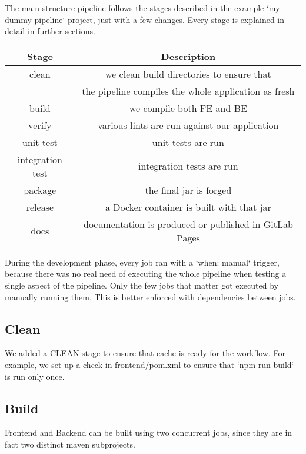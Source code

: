 \documentclass[a4paper,10pt]{scrartcl}
\begin{document}
The main structure pipeline follows the stages described in the example `my-dummy-pipeline` project, just with a few changes. Every stage is explained in detail in further sections.

\begin{center}
    \begin{tabular}{|c|c|}
        \hline
        Stage & Description \\
        \hline
        clean & we clean build directories to ensure that \\
        & the pipeline compiles the whole application as fresh \\
        \hline
        build & we compile both FE and BE \\
        \hline
        verify & various lints are run against our application \\
        \hline
        unit test & unit tests are run \\
        \hline
        integration test & integration tests are run \\
        \hline
        package & the final jar is forged \\
        \hline
        release & a Docker container is built with that jar \\
        \hline
        docs & documentation is produced or published in GitLab Pages \\
        \hline
    \end{tabular}
\end{center}

During the development phase, every job ran with a `when: manual` trigger, because there was no real need of executing the whole pipeline when testing a single aspect of the pipeline. Only the few jobs that matter got executed by manually running them. This is better enforced with dependencies between jobs.

\subsection{Clean}

We added a CLEAN stage to ensure that cache is ready for the workflow. For example, we set up a check in frontend/pom.xml to ensure that `npm run build` is run only once.

\subsection{Build}

Frontend and Backend can be built using two concurrent jobs, since they are in fact two distinct maven subprojects.
\end{document}
